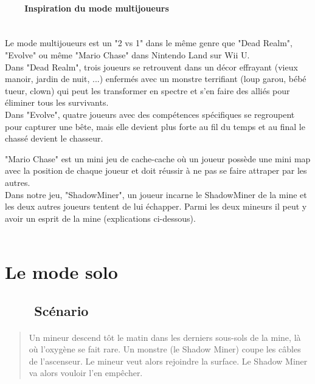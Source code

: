 \documentclass[titlepage, 13px, a4paper]{report}
\begin{document}
\paragraph[Inspiration du mode multijoueurs]{~~~~Inspiration du mode multijoueurs} \hspace{0pt} \\
Le mode multijoueurs est un "2 vs 1" dans le même genre que "Dead Realm", "Evolve" 
ou même "Mario Chase" dans Nintendo Land sur Wii U. 
\\
Dans "Dead Realm", trois joueurs se retrouvent dans un décor effrayant (vieux manoir, jardin de nuit, ...) enfermés 
avec un monstre terrifiant (loup garou, bébé tueur, clown) qui peut les transformer 
en spectre et s'en faire des alliés pour éliminer tous les survivants. 
\\
Dans "Evolve", quatre joueurs avec des compétences spécifiques se regroupent pour capturer 
une bête, mais elle devient plus forte au fil du temps et au final le chassé devient le chasseur. 

\newpage

"Mario Chase" est un mini jeu de cache-cache où un joueur possède une mini map 
avec la position de chaque joueur et doit réussir à ne pas se faire attraper par les autres. 
\\
Dans notre jeu, "ShadowMiner", un joueur incarne le ShadowMiner de la mine et les deux autres 
joueurs tentent de lui échapper. Parmi les deux mineurs il peut y avoir un esprit de la mine (explications ci-dessous). \\ \\


\section{Le mode solo}

\subsection[Scénario]{~~~~Scénario}
\paragraph*{} \hspace{0pt}
\begin{quotation}
	Un mineur descend tôt le matin dans les derniers sous-sols de la mine, là où l’oxygène se fait rare. 
	Un monstre (le Shadow Miner) coupe les câbles de l’ascenseur. 
	Le mineur veut alors rejoindre la surface. Le Shadow Miner va alors vouloir l’en empêcher. \\
\end{quotation}
\end{document}
